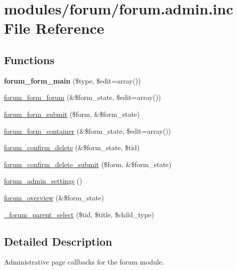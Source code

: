 \hypertarget{forum_8admin_8inc}{
\section{modules/forum/forum.admin.inc File Reference}
\label{forum_8admin_8inc}
}
\subsection*{Functions}
\begin{CompactItemize}
\item 
\hypertarget{forum_8admin_8inc_ac7be1aa9e7ee3f1ff6a495c0c68b5de}{
\textbf{forum\_\-form\_\-main} (\$type, \$edit=array())}
\label{forum_8admin_8inc_ac7be1aa9e7ee3f1ff6a495c0c68b5de}

\item 
\hyperlink{group__forms_ge41c2269ce5b8656e54175970197d345}{forum\_\-form\_\-forum} (\&\$form\_\-state, \$edit=array())
\item 
\hyperlink{forum_8admin_8inc_517cd1e23374b0242a197a3c5250a0c9}{forum\_\-form\_\-submit} (\$form, \&\$form\_\-state)
\item 
\hyperlink{group__forms_g00821d767c47cbcebe320c02516743a5}{forum\_\-form\_\-container} (\&\$form\_\-state, \$edit=array())
\item 
\hyperlink{forum_8admin_8inc_ade50fde9ac2dcd0b03902770597fde2}{forum\_\-confirm\_\-delete} (\&\$form\_\-state, \$tid)
\item 
\hyperlink{forum_8admin_8inc_ef93d685b6f28845e233fc1f697c05ab}{forum\_\-confirm\_\-delete\_\-submit} (\$form, \&\$form\_\-state)
\item 
\hyperlink{forum_8admin_8inc_cd8c00cc4e3eafecdfc06b733e3c19da}{forum\_\-admin\_\-settings} ()
\item 
\hyperlink{forum_8admin_8inc_73cf6d0144f77c06f14ba36ded4cbcf3}{forum\_\-overview} (\&\$form\_\-state)
\item 
\hyperlink{forum_8admin_8inc_b33107c6a704c306d24ed1ea5dd8dc35}{\_\-forum\_\-parent\_\-select} (\$tid, \$title, \$child\_\-type)
\end{CompactItemize}


\subsection{Detailed Description}
Administrative page callbacks for the forum module. 

